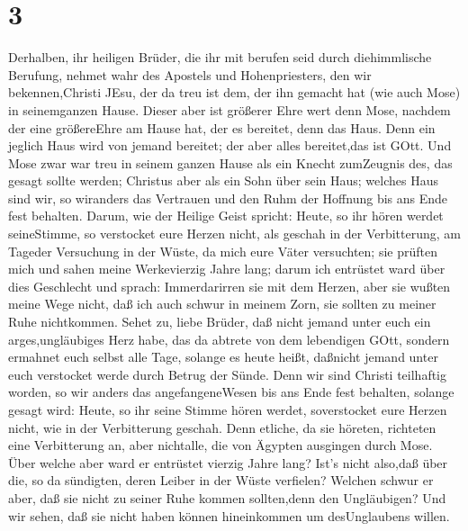 \hypertarget{section-1}{%
\section{3}\label{section-1}}

 Derhalben, ihr heiligen Brüder, die ihr mit berufen seid
durch diehimmlische Berufung, nehmet wahr des Apostels und
Hohenpriesters, den wir bekennen,Christi JEsu,  der da treu
ist dem, der ihn gemacht hat (wie auch Mose) in seinemganzen Hause.
 Dieser aber ist größerer Ehre wert denn Mose, nachdem der
eine größereEhre am Hause hat, der es bereitet, denn das Haus.
 Denn ein jeglich Haus wird von jemand bereitet; der aber
alles bereitet,das ist GOtt.  Und Mose zwar war treu in
seinem ganzen Hause als ein Knecht zumZeugnis des, das gesagt sollte
werden;  Christus aber als ein Sohn über sein Haus; welches
Haus sind wir, so wiranders das Vertrauen und den Ruhm der Hoffnung bis
ans Ende fest behalten.  Darum, wie der Heilige Geist
spricht: Heute, so ihr hören werdet seineStimme,  so
verstocket eure Herzen nicht, als geschah in der Verbitterung, am
Tageder Versuchung in der Wüste,  da mich eure Väter
versuchten; sie prüften mich und sahen meine Werkevierzig Jahre lang;
 darum ich entrüstet ward über dies Geschlecht und sprach:
Immerdarirren sie mit dem Herzen, aber sie wußten meine Wege nicht,
 daß ich auch schwur in meinem Zorn, sie sollten zu meiner
Ruhe nichtkommen.  Sehet zu, liebe Brüder, daß nicht jemand
unter euch ein arges,ungläubiges Herz habe, das da abtrete von dem
lebendigen GOtt,  sondern ermahnet euch selbst alle Tage,
solange es heute heißt, daßnicht jemand unter euch verstocket werde
durch Betrug der Sünde.  Denn wir sind Christi teilhaftig
worden, so wir anders das angefangeneWesen bis ans Ende fest behalten,
 solange gesagt wird: Heute, so ihr seine Stimme hören
werdet, soverstocket eure Herzen nicht, wie in der Verbitterung geschah.
 Denn etliche, da sie höreten, richteten eine Verbitterung
an, aber nichtalle, die von Ägypten ausgingen durch Mose. 
Über welche aber ward er entrüstet vierzig Jahre lang? Ist's nicht
also,daß über die, so da sündigten, deren Leiber in der Wüste verfielen?
 Welchen schwur er aber, daß sie nicht zu seiner Ruhe
kommen sollten,denn den Ungläubigen?  Und wir sehen, daß
sie nicht haben können hineinkommen um desUnglaubens willen.

